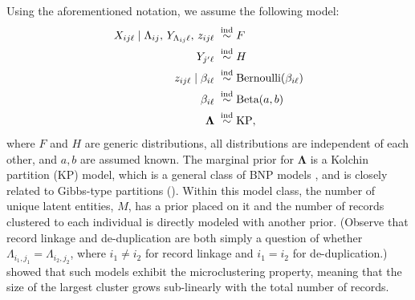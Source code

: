\documentclass[11pt]{article}\usepackage[]{graphicx}\usepackage[]{color}
\begin{document}
Using the aforementioned notation, we assume the following model:
\begin{align}
X_{ij\ell}\mid \Lambda_{ij},\,Y_{\Lambda_{ij}\ell},\,z_{ij\ell}\;& \stackrel{\text{ind}}{\sim} F \notag\\
Y_{j'\ell}\;&\stackrel{\text{ind}}{\sim}H \notag \\
z_{ij\ell}\mid\beta_{i\ell}\;&\stackrel{\text{ind}}{\sim}\text{Bernoulli}(\beta_{i\ell}) \notag\\
\beta_{i\ell}\;&\stackrel{\text{ind}}{\sim}\text{Beta}(a,b) \notag \\
\boldsymbol \Lambda\;&\stackrel{\text{ind}}{\sim}\text{KP}, \label{model:string}
\end{align}
where $F$ and $H$ are generic distributions, all distributions are independent of each other, and $a,b$ are assumed known.  The marginal prior for $\bm \Lambda$ is a Kolchin partition (KP) model, which is a general class of BNP models \citep{zanella2016microclustering}, and is closely related to Gibbs-type partitions (\cite[theorem 1.2]{pitman06combinatorial}). Within this model class, the number of unique latent entities, $M$, has a prior placed on it and the number of records clustered to each individual is directly modeled with another prior.  (Observe that record linkage and de-duplication are both simply a question of whether $\Lambda_{i_1,j_1}=\Lambda_{i_2,j_2}$, where $i_1\ne i_2$ for record linkage and $i_1=i_2$ for de-duplication.) \citep{zanella2016microclustering} showed that such models exhibit the microclustering property, meaning that the size of the largest cluster grows sub-linearly with the total number of records. 
 
\end{document}
